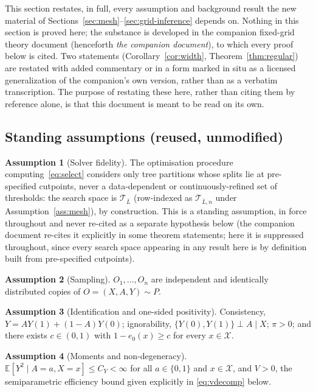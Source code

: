 \documentclass[11pt]{article}
\theoremstyle{plain}
\theoremstyle{definition}
\newtheorem{assumption}{Assumption}
\theoremstyle{remark}
\newcommand{\E}{\mathbb{E}}
\newcommand{\cX}{\mathcal{X}}
\newcommand{\cT}{\mathcal{T}}
\newcommand{\ez}{e_0}
\begin{document}
This section restates, in full, every assumption and background result the
new material of Sections~\ref{sec:mesh}--\ref{sec:grid-inference} depends
on. Nothing in this section is proved here; the substance is developed in
the companion fixed-grid theory document (henceforth \emph{the companion
document}), to which every proof below is cited. Two statements
(Corollary~\ref{cor:width}, Theorem~\ref{thm:regular}) are restated with
added commentary or in a form marked in situ as a licensed generalization
of the companion's own version, rather than as a verbatim transcription.
The purpose of restating these here, rather than citing them by reference
alone, is that this document is meant to be read on its own.

\subsection{Standing assumptions (reused, unmodified)}\label{sec:background-assumptions}

\begin{assumption}[Solver fidelity]\label{ass:solver}
The optimisation procedure computing~\eqref{eq:select} considers only tree
partitions whose splits lie at pre-specified cutpoints, never a
data-dependent or continuously-refined set of thresholds: the search space
is $\cT_{\bar L}$ (row-indexed as $\cT_{\bar L,n}$ under
Assumption~\ref{ass:mesh}), by construction. This is a standing assumption,
in force throughout and never re-cited as a separate hypothesis below
(the companion document re-cites it explicitly in some theorem statements;
here it is suppressed throughout, since every search space appearing in any
result here is by definition built from pre-specified cutpoints).
\end{assumption}

\begin{assumption}[Sampling]\label{ass:iid}
$O_1,\dots,O_n$ are independent and identically distributed copies of
$O=(X,A,Y)\sim P$.
\end{assumption}

\begin{assumption}[Identification and one-sided positivity]\label{ass:causal}
Consistency, $Y=AY(1)+(1-A)Y(0)$; ignorability,
$\{Y(0),Y(1)\}\perp A\mid X$; $\pi>0$; and there exists $c\in(0,1)$ with
$1-\ez(x)\ge c$ for every $x\in\cX$.
\end{assumption}

\begin{assumption}[Moments and non-degeneracy]\label{ass:moments}
$\E[Y^2\mid A=a,X=x]\le C_Y<\infty$ for all $a\in\{0,1\}$ and $x\in\cX$, and
$V>0$, the semiparametric efficiency bound given explicitly in
\eqref{eq:vdecomp} below.
\end{assumption}
\end{document}
